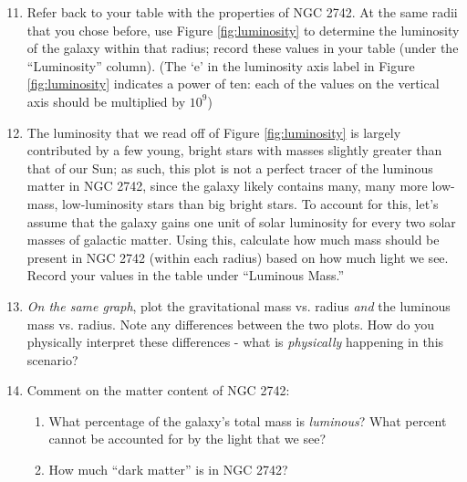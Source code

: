 \documentclass[11pt]{article}%
\begin{document}
\begin{enumerate}
\setcounter{enumi}{10}

\item Refer back to your table with the properties of NGC 2742. At the same radii that you chose before, use Figure \ref{fig:luminosity} to determine the luminosity of the galaxy within that radius; record these values in your table (under the ``Luminosity'' column). (The `e' in the luminosity axis label in Figure \ref{fig:luminosity} indicates a power of ten: each of the values on the vertical axis should be multiplied by $10^9$)

\item The luminosity that we read off of Figure \ref{fig:luminosity} is largely contributed by a few young, bright stars with masses slightly greater than that of our Sun; as such, this plot is not a perfect tracer of the luminous matter in NGC 2742, since the galaxy likely contains many, many more low-mass, low-luminosity stars than big bright stars. To account for this, let's assume that the galaxy gains one unit of solar luminosity for every two solar masses of galactic matter. Using this, calculate how much mass should be present in NGC 2742 (within each radius) based on how much light we see. Record your values in the table under ``Luminous Mass.''

\item \emph{On the same graph}, plot the gravitational mass vs. radius \emph{and} the luminous mass vs. radius. Note any differences between the two plots. How do you physically interpret these differences - what is \textit{physically} happening in this scenario?

\item Comment on the matter content of NGC 2742:
\begin{enumerate}
    \item What percentage of the galaxy's total mass is \emph{luminous}? What percent cannot be accounted for by the light that we see?
    
    \item How much ``dark matter'' is in NGC 2742?
\end{enumerate}
 
\end{enumerate}

\end{document}

